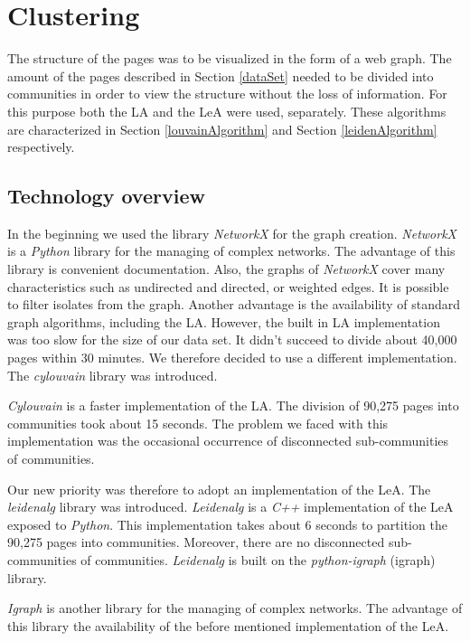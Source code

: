 \section{Clustering}\label{ClusteringDevelopment}
The structure of the pages was to be visualized in the form of a web graph. The amount of the pages described in Section \ref{dataSet} needed to be divided into communities in order to view the structure without the loss of information. For this purpose both the LA and the LeA were used, separately. These algorithms are characterized in Section \ref{louvainAlgorithm} and Section \ref{leidenAlgorithm} respectively. 

\subsection{Technology overview} \label{ClusteringTechonologyOverview}
In the beginning we used the library \textit{NetworkX} \cite{networkX} for the graph creation. \textit{NetworkX} is a \textit{Python} library for the managing of complex networks. The advantage of this library is convenient documentation. Also, the graphs of \textit{NetworkX} cover many characteristics such as undirected and directed, or weighted edges. It is possible to filter isolates from the graph. Another advantage is the availability of standard graph algorithms, including the LA. However, the built in LA implementation was too slow for the size of our data set. It didn't succeed to divide about 40,000 pages within 30 minutes. We therefore decided to use a different implementation. The \textit{cylouvain} library \cite{cylouvain} was introduced. 

\textit{Cylouvain} is a faster implementation of the LA. The division of 90,275 pages into communities took about 15 seconds. The problem we faced with this implementation was the occasional occurrence of disconnected sub-communities of communities. 

Our new priority was therefore to adopt an implementation of the LeA. The \textit{leidenalg} \cite{leidenalg} library was introduced. \textit{Leidenalg} is a \textit{C++} implementation of the LeA exposed to \textit{Python}. This implementation takes about 6 seconds to partition the 90,275 pages into communities. Moreover, there are no disconnected sub-communities of communities. \textit{Leidenalg} is built on the \textit{python-igraph} (igraph) library. 

\textit{Igraph} is another library for the managing of complex networks. The advantage of this library the availability of the before mentioned implementation of the LeA.

